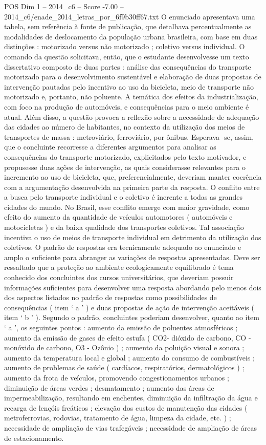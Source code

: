 \begin{textsample}{POS Dim 1 – 2014\_c6 – Score -7.00 – 2014\_c6/enade\_2014\_letras\_por\_6f9b30ff67.txt}
O enunciado apresentava uma tabela, sem referência à fonte de publicação, que detalhava percentualmente as modalidades de deslocamento da população urbana brasileira, com base em duas distinções : motorizado versus não motorizado ; coletivo versus individual.
O comando da questão solicitava, então, que o estudante desenvolvesse um texto dissertativo composto de duas partes : análise das consequências do transporte motorizado para o desenvolvimento sustentável e elaboração de duas propostas de intervenção pautadas pelo incentivo ao uso da bicicleta, meio de transporte não motorizado e, portanto, não poluente.
A temática dos efeitos da industrialização, com foco na produção de automóveis, e consequências para o meio ambiente é atual.
Além disso, a questão provoca a reflexão sobre a necessidade de adequação das cidades ao número de habitantes, no contexto da utilização dos meios de transportes de massa : metroviário, ferroviário, por ônibus.
Esperava -se, assim, que o concluinte recorresse a diferentes argumentos para analisar as consequências do transporte motorizado, explicitados pelo texto motivador, e propusesse duas ações de intervenção, as quais considerasse relevantes para o incremento ao uso de bicicleta, que, preferencialmente, deveriam manter coerência com a argumentação desenvolvida na primeira parte da resposta.
O conflito entre a busca pelo transporte individual e o coletivo é inerente a todas as grandes cidades do mundo.
No Brasil, esse conflito emerge com maior gravidade, como efeito do aumento da quantidade de veículos automotores ( automóveis e motocicletas ) e da baixa qualidade dos transportes coletivos.
Tal associação incentiva o uso de meios de transporte individual em detrimento da utilização dos coletivos.
O padrão de respostas era tecnicamente adequado ao enunciado e amplo o suficiente para abranger as variações de respostas apresentadas.
Deve ser ressaltado que a proteção ao ambiente ecologicamente equilibrado é tema conhecido dos concluintes dos cursos universitários, que deveriam possuir informações suficientes para desenvolver uma resposta abordando pelo menos dois dos aspectos listados no padrão de respostas como possibilidades de consequências ( item ‘ a ’ ) e duas propostas de ação de intervenção aceitáveis ( item ‘ b ’ ).
Segundo o padrão, concluintes poderiam desenvolver, quanto ao item ‘ a ’, os seguintes pontos : aumento da emissão de poluentes atmosféricos ; aumento da emissão de gases de efeito estufa ( CO2- dióxido de carbono, CO - monóxido de carbono, O3 - Ozônio ) ; aumento da poluição visual e sonora ; aumento da temperatura local e global ; aumento do consumo de combustíveis ; aumento de problemas de saúde ( cardíacos, respiratórios, dermatológicos ) ; aumento da frota de veículos, promovendo congestionamentos urbanos ; diminuição de áreas verdes ; desmatamento ; aumento das áreas de impermeabilização, resultando em enchentes, diminuição da infiltração da água e recarga de lençóis freáticos ; elevação dos custos de manutenção das cidades ( metroferrovias, rodovias, tratamento de água, limpeza da cidade, etc. ) ; necessidade de ampliação de vias trafegáveis ; necessidade de ampliação de áreas de estacionamento.

\end{textsample}

